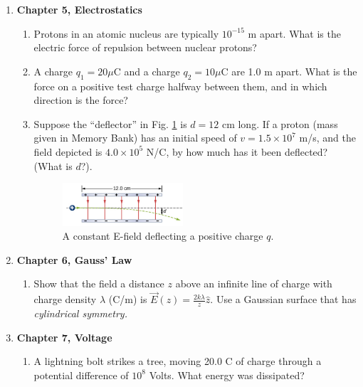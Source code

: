 \documentclass[10pt]{article}
\begin{document}
\clearpage

\begin{enumerate}
\item \textbf{Chapter 5, Electrostatics}
\begin{enumerate}
\item Protons in an atomic nucleus are typically $10^{-15}$ m apart. What is the electric force of repulsion between nuclear protons? \\ \vspace{2cm}
\item A charge $q_1 = 20 \mu$C and a charge $q_2 = 10 \mu$C are 1.0 m apart.  What is the force on a positive test charge halfway between them, and in which direction is the force? \\ \vspace{2cm}
\item Suppose the ``deflector'' in Fig. \ref{fig:e1} is $d=12$ cm long.  If a proton (mass given in Memory Bank) has an initial speed of $v=1.5 \times 10^{7}$ m/s, and the field depicted is $4.0 \times 10^5$ N/C, by how much has it been deflected?  (What is $d$?). \\ \vspace{2cm}
\begin{figure}
\centering
\includegraphics[width=0.45\textwidth]{figures/e1.png}
\caption{\label{fig:e1} A constant E-field deflecting a positive charge $q$.}
\end{figure}
\end{enumerate}
\item \textbf{Chapter 6, Gauss' Law}
\begin{enumerate}
\item Show that the field a distance $z$ above an infinite line of charge with charge density $\lambda$ (C/m) is $\vec{E}(z) = \frac{2k\lambda}{z}\hat{z}$.  Use a Gaussian surface that has \textit{cylindrical symmetry.} \\ \vspace{2cm}
\end{enumerate}
\item \textbf{Chapter 7, Voltage}
\begin{enumerate}
\item A lightning bolt strikes a tree, moving 20.0 C of charge through a potential difference of $10^8$ Volts. What energy was dissipated? \\ \vspace{2cm}

\end{enumerate}
\end{enumerate}
\end{document}

